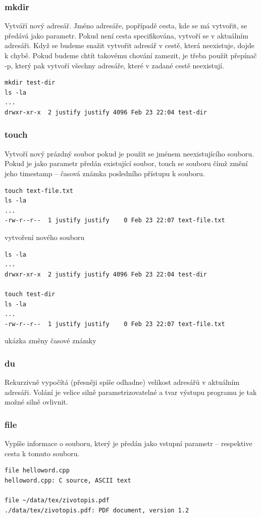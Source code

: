 \documentclass{article}
\begin{document}
\subsubsection{mkdir}
Vytváří nový adresář. Jméno adresáře, popřípadě cesta, kde se má vytvořit, se předává jako parametr. Pokud není cesta specifikována, vytvoří se v aktuálním adresáři. Když se budeme snažit vytvořit adresář v cestě, která neexistuje, dojde k chybě. Pokud budeme chtít takovému chování zamezit, je třeba použít přepínač -p, který pak vytvoří všechny adresáře, které v zadané cestě neexistují.
\begin{verbatim}
mkdir test-dir
ls -la
...
drwxr-xr-x  2 justify justify 4096 Feb 23 22:04 test-dir
\end{verbatim}

\subsubsection{touch}
Vytvoří nový prázdný soubor pokud je použit se jménem neexistujícího souboru. Pokud je jako parametr předán existující soubor, touch se souboru  čímž změní jeho timestamp -- časová známka posledního přístupu k souboru.
\begin{verbatim}
touch text-file.txt
ls -la
...
-rw-r--r--  1 justify justify    0 Feb 23 22:07 text-file.txt
\end{verbatim}
vytvoření nového souboru

\begin{verbatim}
ls -la
...
drwxr-xr-x  2 justify justify 4096 Feb 23 22:04 test-dir

touch test-dir
ls -la
...
-rw-r--r--  1 justify justify    0 Feb 23 22:07 text-file.txt
\end{verbatim}
ukázka změny časové známky

\subsubsection{du}
Rekurzivně vypočítá (přesněji spíše odhadne) velikost adresářů v aktuálním adresáři. Volání je velice silně parametrizovatelné a tvar výstupu programu je tak možné silně ovlivnit.

\subsubsection{file}
Vypíše informace o souboru, který je předán jako vstupní parametr -- respektive cesta k tomuto souboru.
\begin{verbatim}
file helloword.cpp
helloword.cpp: C source, ASCII text

file ~/data/tex/zivotopis.pdf
./data/tex/zivotopis.pdf: PDF document, version 1.2
\end{verbatim}
\end{document}

